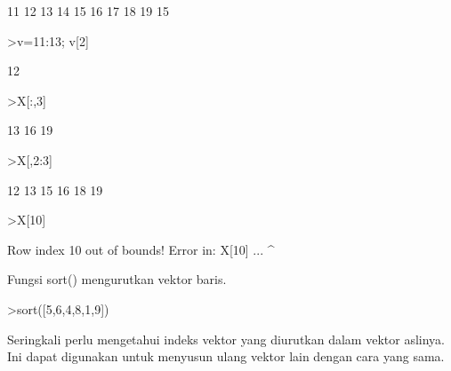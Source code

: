 \documentclass[a4paper,10pt]{article}
\begin{document}
\begin{eulernotebook}
\begin{eulercomment}
\begin{eulercomment}
\begin{eulercomment}
\begin{eulercomment}
\begin{eulercomment}
\begin{eulercomment}
\begin{eulercomment}
\begin{eulercomment}
\begin{euleroutput}
             11            12            13 
             14            15            16 
             17            18            19 
  15
\end{euleroutput}
\begin{eulerprompt}
>v=11:13; v[2]
\end{eulerprompt}
\begin{euleroutput}
  12
\end{euleroutput}
\begin{eulerprompt}
>X[:,3]
\end{eulerprompt}
\begin{euleroutput}
             13 
             16 
             19 
\end{euleroutput}
\begin{eulerprompt}
>X[,2:3]
\end{eulerprompt}
\begin{euleroutput}
             12            13 
             15            16 
             18            19 
\end{euleroutput}
\begin{eulerprompt}
>X[10]
\end{eulerprompt}
\begin{euleroutput}
  Row index 10 out of bounds!
  Error in:
  X[10] ...
       ^
\end{euleroutput}
\begin{eulercomment}
Fungsi sort() mengurutkan vektor baris.
\end{eulercomment}
\begin{eulerprompt}
>sort([5,6,4,8,1,9])
\end{eulerprompt}
\begin{euleroutput}
  [1,  4,  5,  6,  8,  9]
\end{euleroutput}
\begin{eulercomment}
Seringkali perlu mengetahui indeks vektor yang diurutkan dalam vektor
aslinya. Ini dapat digunakan untuk menyusun ulang vektor lain dengan
cara yang sama.


\end{eulercomment}
\end{eulercomment}
\end{eulercomment}
\end{eulercomment}
\end{eulercomment}
\end{eulercomment}
\end{eulercomment}
\end{eulercomment}
\end{eulercomment}
\end{eulernotebook}
\end{document}
